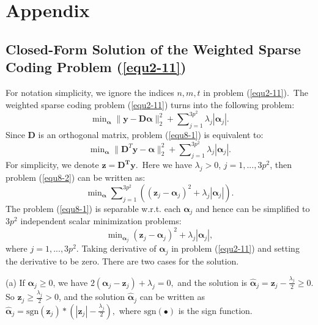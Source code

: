 %
\chapter{Appendix}
\label{sec:appendix}

\section{Closed-Form Solution of the Weighted Sparse Coding Problem (\ref{equ2-11})}

For notation simplicity, we ignore the indices $n,m,t$ in problem (\ref{equ2-11}).\ The weighted sparse coding problem (\ref{equ2-11}) turns into the following problem:
\begin{equation}
\label{equ8-1}
\min\nolimits_{\bm{\alpha}}\|\bm{y}-\bm{D}\bm{\alpha}\|_{2}^{2}+\sum\nolimits_{j=1}^{3p^2}\lambda_{j}|\bm{\alpha}_{j}|.
\end{equation}
Since $\bm{D}$ is an orthogonal matrix, problem (\ref{equ8-1}) is equivalent to:
\begin{equation}
\label{equ8-2}
\min\nolimits_{\bm{\alpha}}\|\bm{D}^{T}\bm{y}-\bm{\alpha}\|_{2}^{2}+\sum\nolimits_{j=1}^{3p^2}\lambda_{j}|\bm{\alpha}_{j}|.
\end{equation}
For simplicity, we denote $\bm{z} = \bm{D^{T}y}$.\ Here we have $\lambda_{j}>0$, $j=1,...,3p^2$, then problem (\ref{equ8-2}) can be written as:
\begin{equation}
\label{equ8-3}
\min\nolimits_{\boldsymbol{\alpha}}\sum\nolimits_{j=1}^{3p^2}((\bm{z}_{j}-\bm{\alpha}_{j})^{2}+\lambda_{j}|\bm{\alpha}_{j}|).
\end{equation}
The problem (\ref{equ8-1}) is separable w.r.t. each $\bm{\alpha}_{j}$ and hence can be simplified to $3p^2$ independent scalar minimization problems:
\begin{equation}
\label{equ8-4}
\min\nolimits_{\bm{\alpha}_{j}}(\bm{z}_{j}-\bm{\alpha}_{j})^{2}+\lambda_{j}|\bm{\alpha}_{j}|,
\end{equation}
where $j=1,...,3p^2$. Taking derivative of $\bm{\alpha}_{j}$ in problem (\ref{equ2-11}) and setting the derivative to be zero. There are two cases for the solution.

(a) If $\bm{\alpha}_{j}\ge 0$, we have 
$
2(\bm{\alpha}_{j}-\bm{z}_{j})+\lambda_{j}=0,
$ and the solution is
$
\hat{\bm{\alpha}}_{j}=\bm{z}_{j}-\frac{\lambda_{j}}{2} \ge 0.
$
So $\bm{z}_{j}\ge\frac{\lambda_{j}}{2}> 0$, and the solution $\hat{\bm{\alpha}}_{j}$ can be written as
$
\hat{\bm{\alpha}}_{j}=\text{sgn}(\bm{z}_{j})*(|\bm{z}_{j}|-\frac{\lambda_{j}}{2}),
$
where $\text{sgn}(\bullet)$ is the sign function. 

